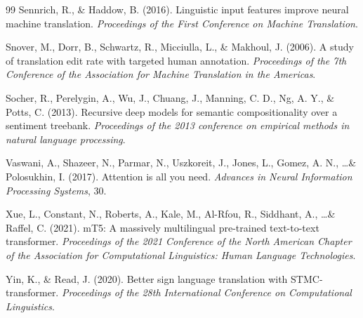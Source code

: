 \documentclass[12pt]{article}
\begin{document}
\begin{thebibliography}{99}
Sennrich, R., \& Haddow, B. (2016). Linguistic input features improve neural machine translation. \textit{Proceedings of the First Conference on Machine Translation}.

Snover, M., Dorr, B., Schwartz, R., Micciulla, L., \& Makhoul, J. (2006). A study of translation edit rate with targeted human annotation. \textit{Proceedings of the 7th Conference of the Association for Machine Translation in the Americas}.

Socher, R., Perelygin, A., Wu, J., Chuang, J., Manning, C. D., Ng, A. Y., \& Potts, C. (2013). Recursive deep models for semantic compositionality over a sentiment treebank. \textit{Proceedings of the 2013 conference on empirical methods in natural language processing}.

Vaswani, A., Shazeer, N., Parmar, N., Uszkoreit, J., Jones, L., Gomez, A. N., \ldots \& Polosukhin, I. (2017). Attention is all you need. \textit{Advances in Neural Information Processing Systems}, 30.

Xue, L., Constant, N., Roberts, A., Kale, M., Al-Rfou, R., Siddhant, A., \ldots \& Raffel, C. (2021). mT5: A massively multilingual pre-trained text-to-text transformer. \textit{Proceedings of the 2021 Conference of the North American Chapter of the Association for Computational Linguistics: Human Language Technologies}.

Yin, K., \& Read, J. (2020). Better sign language translation with STMC-transformer. \textit{Proceedings of the 28th International Conference on Computational Linguistics}.

\end{thebibliography}
\end{document}
